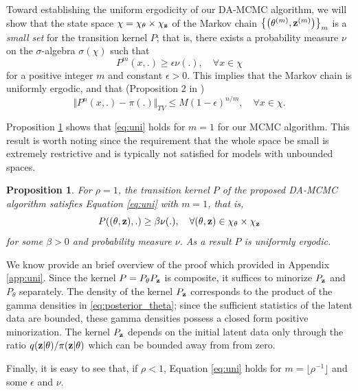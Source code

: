 \documentclass[11pt]{article}
\newtheorem{proposition}{Proposition}[section]
\begin{document}
	Toward establishing the uniform ergodicity of our DA-MCMC algorithm, we will show that the state space $\chi = \chi_{\theta}\times\chi_{\mathbf{z}}$ of the Markov chain $\left\{\left(\theta^{(m)}, \mathbf{z}^{(m)}\right)\right\}_m$ is a \textit{small set} for the transition kernel $P$; that is, there exists a probability measure $\nu$ on the $\sigma$-algebra $\sigma(\chi)$ such that
	\begin{equation}
	\label{eq:uni}
	    P^m(x,.) \ge \epsilon \nu(.), \quad \forall x\in \chi
	\end{equation}
	for a positive integer $m$ and constant $\epsilon > 0$. This implies that the Markov chain is uniformly ergodic, and that (Proposition 2 in \cite{Tierney.1994})
	$$
	\Vert P^n(x,.)-\pi(.)\Vert_{TV} \le M (1-\epsilon)^{n/m}, \quad \forall x \in \chi.
	$$
	
	Proposition \ref{pro:uni} shows that \eqref{eq:uni} holds for $m=1$ for our MCMC algorithm. This result is worth noting since the requirement that the whole space be small is extremely restrictive and is typically not satisfied for models with unbounded spaces.
	
	\begin{proposition}
		\label{pro:uni}
		For $\rho = 1$, the transition kernel $P$ of the proposed DA-MCMC algorithm satisfies Equation \ref{eq:uni} with $m=1$, that is,
		$$P((\theta, \mathbf{z}), .) \ge \beta \nu(.) , \quad \forall (\theta, \mathbf{z}) \in \chi_\theta \times \chi_{\mathbf{z}}
		$$
		for some $\beta>0$ and probability measure $\nu$. As a result $P$ is uniformly ergodic.
	\end{proposition}
	
	We know provide an brief overview of the proof which provided in Appendix \ref{app:uni}. Since the kernel $P = P_{\theta} P_{\mathbf{z}}$ is composite, it suffices to minorize $P_{\mathbf{z}}$ and $P_\theta$ separately. The density of the kernel $P_{\mathbf{z}}$ corresponds to the product of the gamma densities in \ref{eq:posterior_theta}; since the sufficient statistics of the latent data are bounded, these gamma densities possess a closed form positive minorization. The kernel $P_{\mathbf{z}}$ depends on the initial latent data only through the ratio $q(\mathbf{z}|\theta)/\pi(\mathbf{z}|\theta)$ which can be bounded away from from zero.
	
	Finally, it is easy to see that, if $\rho < 1$, Equation \eqref{eq:uni} holds for 
	$m=\lfloor \rho^{-1} \rfloor$ and some $\epsilon$ and $\nu$.
	
	
\end{document}
